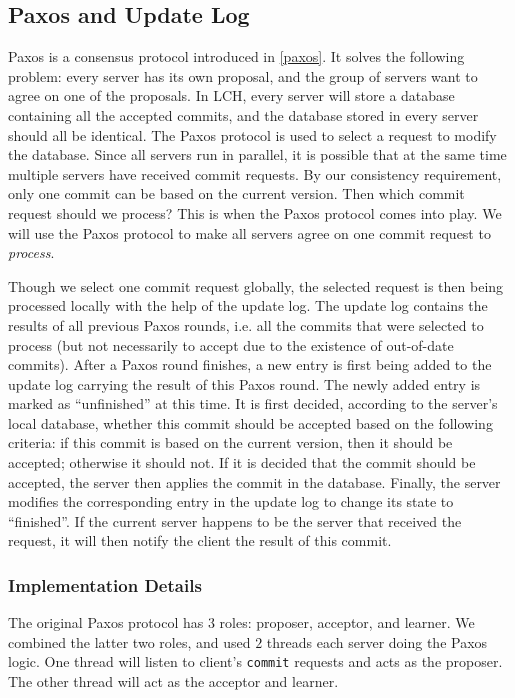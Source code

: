 \documentclass[11pt]{article}
\begin{document}
\subsection{Paxos and Update Log}
\label{sec:paxos}
Paxos is a consensus protocol introduced in \ref{paxos}.
It solves the following problem:
every server has its own proposal, and the group of servers want to agree on one of the proposals.
In LCH, every server will store a database containing all the accepted commits, and the database stored in every server should all be identical.
The Paxos protocol is used to select a request to modify the database.
Since all servers run in parallel, it is possible that at the same time multiple servers have received commit requests.
By our consistency requirement, only one commit can be based on the current version.
Then which commit request should we process?
This is when the Paxos protocol comes into play.
We will use the Paxos protocol to make all servers agree on one commit request to \emph{process}.

Though we select one commit request globally, the selected request is then being processed locally with the help of the update log.
The update log contains the results of all previous Paxos rounds, i.e. all the commits that were selected to process (but not necessarily to accept due to the existence of out-of-date commits).
After a Paxos round finishes, a new entry is first being added to the update log carrying the result of this Paxos round.
The newly added entry is marked as ``unfinished'' at this time.
It is first decided, according to the server's local database, whether this commit should be accepted based on the following criteria: if this commit is based on the current version, then it should be accepted; otherwise it should not.
If it is decided that the commit should be accepted, the server then applies the commit in the database.
Finally, the server modifies the corresponding entry in the update log to change its state to ``finished''.
If the current server happens to be the server that received the request, it will then notify the client the result of this commit.

\subsubsection{Implementation Details}
The original Paxos protocol has $3$ roles: proposer, acceptor, and learner.
We combined the latter two roles, and used $2$ threads each server doing the Paxos logic.
One thread will listen to client's \texttt{commit} requests and acts as the proposer.
The other thread will act as the acceptor and learner.
\end{document}
